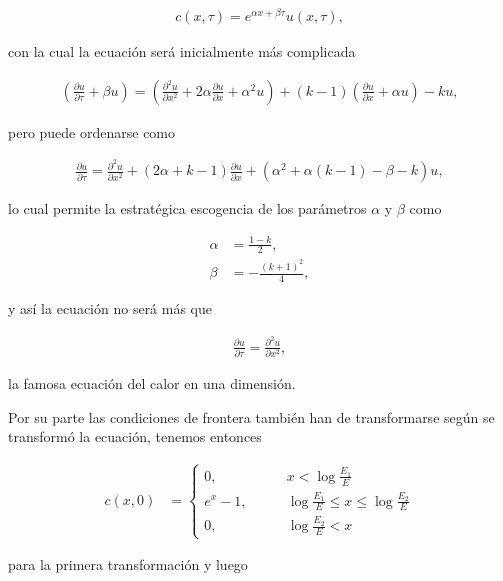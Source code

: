 \documentclass[letter]{article}
\begin{document}
\begin{enumerate}
\begin{enumerate}[label=\alph*)]
\begin{align*}
    c(x,\tau) = e^{\alpha x + \beta\tau}u(x,\tau),
\end{align*}

con la cual la ecuación será inicialmente más complicada

\begin{align*}
    \left(\frac{\partial u}{\partial\tau} + \beta u\right) = \left(\frac{\partial^2u}{\partial x^2} + 2\alpha\frac{\partial u}{\partial x} + \alpha^2u\right) + (k - 1)\left(\frac{\partial u}{\partial x} + \alpha u\right) - ku,
\end{align*}

pero puede ordenarse como

\begin{align*}
    \frac{\partial u}{\partial\tau} = \frac{\partial^2u}{\partial x^2} + \left(2\alpha + k - 1\right)\frac{\partial u}{\partial x} + \left(\alpha^2 + \alpha(k - 1) - \beta - k\right)u,
\end{align*}

lo cual permite la estratégica escogencia de los parámetros $\alpha$ y $\beta$ como

\begin{align*}
    \alpha &= \frac{1 - k}{2},\\
    \beta &= -\frac{(k + 1)^2}{4},
\end{align*}

y así la ecuación no será más que

\begin{align*}
    \frac{\partial u}{\partial\tau} = \frac{\partial^2u}{\partial x^2},
\end{align*}

la famosa ecuación del calor en una dimensión.

Por su parte las condiciones de frontera también han de transformarse según se transformó la ecuación, tenemos entonces

\begin{align*}
    c(x,0) &= \begin{cases}
                0, &\qquad x < \log\frac{E_1}{E}\\
                e^x - 1, &\qquad \log\frac{E_1}{E} \leq x \leq \log\frac{E_2}{E}\\
                0, &\qquad \log\frac{E_2}{E} < x
              \end{cases}
\end{align*}

para la primera transformación y luego


\end{enumerate}
\end{enumerate}
\end{document}
